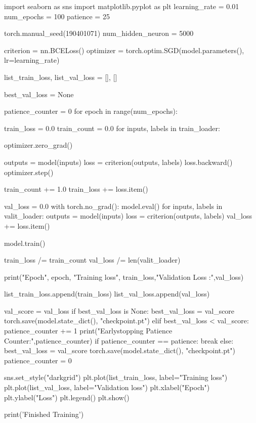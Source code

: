\documentclass[11pt]{article}
\begin{document}
\begin{python}
import seaborn as sns
import matplotlib.pyplot as plt
learning_rate = 0.01
num_epochs = 100
patience = 25

torch.manual_seed(190401071)
num_hidden_neuron = 5000

criterion = nn.BCELoss()
optimizer = torch.optim.SGD(model.parameters(), lr=learning_rate)

list_train_loss, list_val_loss = [], []

best_val_loss = None

patience_counter = 0
for epoch in range(num_epochs):

  train_loss = 0.0
  train_count = 0.0
  for inputs, labels in train_loader:

    optimizer.zero_grad()

    outputs = model(inputs)
    loss = criterion(outputs, labels)
    loss.backward()
    optimizer.step()

    train_count += 1.0
    train_loss += loss.item()

  val_loss = 0.0
  with torch.no_grad():
    model.eval()
    for inputs, labels in valit_loader:
        outputs = model(inputs)
        loss = criterion(outputs, labels)
        val_loss += loss.item()

  model.train()

  train_loss /= train_count
  val_loss /= len(valit_loader)

  print("Epoch", epoch, "Training loss", train_loss,"Validation Loss :",val_loss)

  list_train_loss.append(train_loss)
  list_val_loss.append(val_loss)

  val_score = val_loss
  if best_val_loss is None:
    best_val_loss = val_score 
    torch.save(model.state_dict(), "checkpoint.pt")
  elif best_val_loss < val_score:
    patience_counter += 1
    print("Earlystopping Patience Counter:",patience_counter)
    if patience_counter == patience:
        break
  else:
    best_val_loss = val_score
    torch.save(model.state_dict(), "checkpoint.pt")
    patience_counter = 0

sns.set_style("darkgrid")
plt.plot(list_train_loss, label="Training loss")
plt.plot(list_val_loss, label="Validation loss")
plt.xlabel("Epoch")
plt.ylabel("Loss")
plt.legend()
plt.show()


print('Finished Training')
\end{python}

\begin{comment}
\begin{figure}[ht!]
    \centering
    \texttt{[image: mypicturehere.png]}
    \caption{Buraya açıklama yazın}
    \label{fig:my_pic}
\end{figure}
\end{comment}
\end{document}
